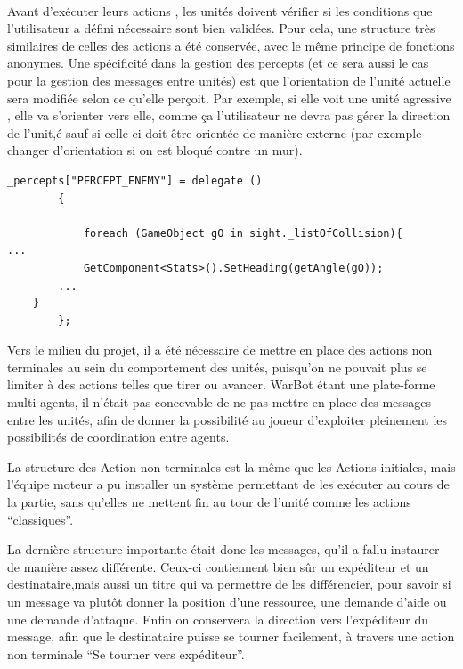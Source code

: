 \documentclass{report}
\begin{document}
\paragraph{}

Avant d'exécuter leurs actions , les unités doivent vérifier si les conditions que l’utilisateur a défini nécessaire sont bien validées. Pour cela, une structure très similaires de celles des actions a été conservée, avec le même principe de fonctions anonymes. 
Une spécificité dans la gestion des percepts (et ce sera aussi le cas pour la gestion des messages entre unités) est que l’orientation de l’unité actuelle sera modifiée selon ce qu’elle perçoit. Par exemple, si elle voit une unité agressive , elle va s’orienter vers elle, comme ça l’utilisateur ne devra pas gérer la direction de l’unit,é sauf si celle ci doit être orientée de manière externe (par exemple changer d’orientation si on est bloqué contre un mur).

\begin{lstlisting}[frame=single]
_percepts["PERCEPT_ENEMY"] = delegate ()
        {
            
            foreach (GameObject gO in sight._listOfCollision){
...
            GetComponent<Stats>().SetHeading(getAngle(gO));
        ...
    }
        };
\end{lstlisting}

Vers le milieu du projet, il a été nécessaire de mettre en place des actions non terminales au sein du comportement des unités, puisqu’on ne pouvait plus se limiter à des actions telles que tirer ou avancer. 
WarBot étant une plate-forme multi-agents, il n’était pas concevable de ne pas mettre en place des messages entre les unités, afin de donner la possibilité au joueur d’exploiter pleinement les possibilités de coordination entre agents.

La structure des Action non terminales est la même que les Actions initiales, mais l’équipe moteur a pu installer un système permettant de les exécuter au cours de la partie, sans qu’elles ne mettent fin au tour de l’unité comme les actions “classiques”.


La dernière structure importante était donc les messages, qu’il a fallu instaurer de manière assez différente.
Ceux-ci contiennent bien sûr un expéditeur et un destinataire,mais aussi un titre qui va permettre de les différencier, pour savoir si un message va plutôt donner la position d’une ressource, une demande d’aide ou une demande d’attaque. Enfin on conservera la direction vers l’expéditeur du message, afin que le destinataire puisse se tourner facilement, à travers une action non terminale “Se tourner vers expéditeur”.
\end{document}
